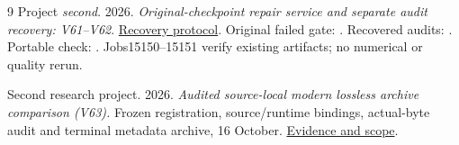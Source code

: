 \documentclass[10pt,twocolumn,letterpaper]{article}
\begin{document}
\begin{thebibliography}{9}
Project \emph{second}. 2026. \emph{Original-checkpoint repair service and separate
audit recovery: V61--V62}.
\href{https://github.com/priyankjairaj100/second/blob/codex/second-cluster-v42/research_v62/PROTOCOL.txt}{Recovery protocol}.
Original failed gate: .
Recovered audits: .
Portable check: .
Jobs15150--15151 verify existing artifacts; no numerical or quality rerun.


Second research project. 2026.
\emph{Audited source-local modern lossless archive comparison (V63).}
Frozen registration, source/runtime bindings, actual-byte audit and terminal
metadata archive, 16 October.
\href{https://github.com/priyankjairaj100/second/blob/codex/second-cluster-v42/docs/TERMINAL_EVIDENCE_V63.txt}{Evidence and scope}.

\end{thebibliography}
\end{document}
